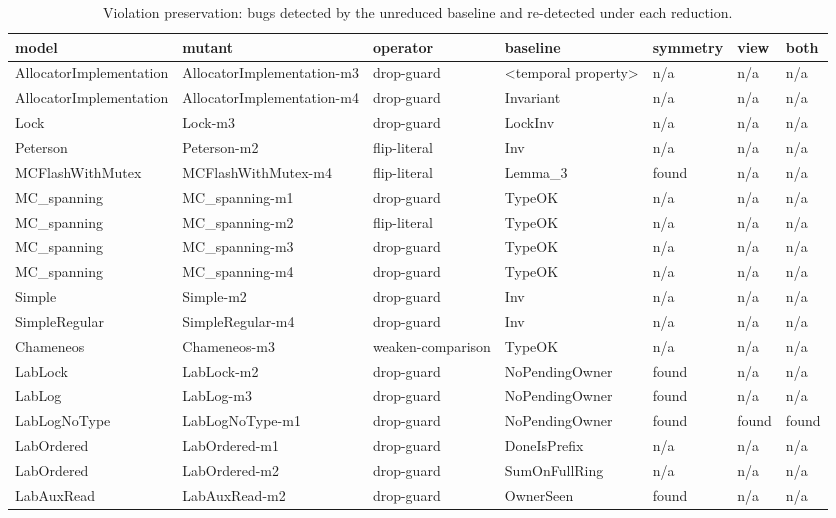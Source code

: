 \begin{table}[t]
\centering
\caption{Violation preservation: bugs detected by the unreduced baseline and re-detected under each reduction.}
\label{tab:rq2}
\small
\begin{tabular}{lllllll}
\toprule
model & mutant & operator & baseline & symmetry & view & both \\
\midrule
AllocatorImplementation & AllocatorImplementation-m3 & drop-guard & <temporal property> & n/a & n/a & n/a \\
AllocatorImplementation & AllocatorImplementation-m4 & drop-guard & Invariant & n/a & n/a & n/a \\
Lock & Lock-m3 & drop-guard & LockInv & n/a & n/a & n/a \\
Peterson & Peterson-m2 & flip-literal & Inv & n/a & n/a & n/a \\
MCFlashWithMutex & MCFlashWithMutex-m4 & flip-literal & Lemma\_3 & found & n/a & n/a \\
MC\_spanning & MC\_spanning-m1 & drop-guard & TypeOK & n/a & n/a & n/a \\
MC\_spanning & MC\_spanning-m2 & flip-literal & TypeOK & n/a & n/a & n/a \\
MC\_spanning & MC\_spanning-m3 & drop-guard & TypeOK & n/a & n/a & n/a \\
MC\_spanning & MC\_spanning-m4 & drop-guard & TypeOK & n/a & n/a & n/a \\
Simple & Simple-m2 & drop-guard & Inv & n/a & n/a & n/a \\
SimpleRegular & SimpleRegular-m4 & drop-guard & Inv & n/a & n/a & n/a \\
Chameneos & Chameneos-m3 & weaken-comparison & TypeOK & n/a & n/a & n/a \\
LabLock & LabLock-m2 & drop-guard & NoPendingOwner & found & n/a & n/a \\
LabLog & LabLog-m3 & drop-guard & NoPendingOwner & found & n/a & n/a \\
LabLogNoType & LabLogNoType-m1 & drop-guard & NoPendingOwner & found & found & found \\
LabOrdered & LabOrdered-m1 & drop-guard & DoneIsPrefix & n/a & n/a & n/a \\
LabOrdered & LabOrdered-m2 & drop-guard & SumOnFullRing & n/a & n/a & n/a \\
LabAuxRead & LabAuxRead-m2 & drop-guard & OwnerSeen & found & n/a & n/a \\
\bottomrule
\end{tabular}
\end{table}
